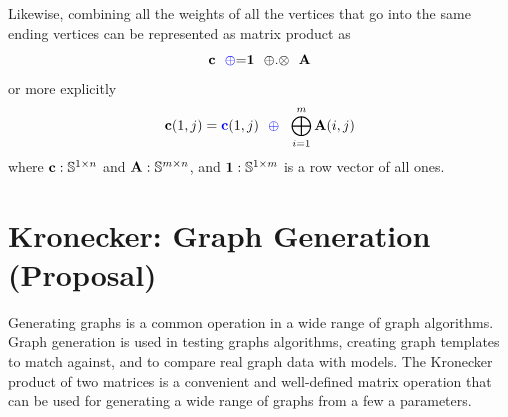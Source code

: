 Likewise, combining all the weights of all the vertices that go into the same ending vertices can be represented as matrix product as
$$
   {\bf c} ~~ {\textcolor{blue}{\oplus}}{=}  {\bf 1} ~~ {\oplus}.{\otimes} ~~{\bf A} 
$$
or more explicitly
$$
   {\bf c}(1,j) = {\textcolor{blue}{\bf c}}(1,j) ~~ {\textcolor{blue}{\oplus}} ~~ \bigoplus_{i=1}^m {\bf A}(i,j)
$$
where ${\bf c}: \mathbb{S}^{1 \times n}$ and ${\bf A}: \mathbb{S}^{m \times n}$, and ${\bf 1}: \mathbb{S}^{1 \times m}$ is a row vector of all ones.


\section{Kronecker: Graph Generation (Proposal)}

  Generating graphs is a common operation in a wide range of graph algorithms.  Graph generation is used in testing graphs algorithms, creating graph templates to match against, and to compare real graph data with models.  The Kronecker product of two matrices is a convenient and well-defined matrix operation that can be used for generating a wide range of graphs from a few a parameters.

